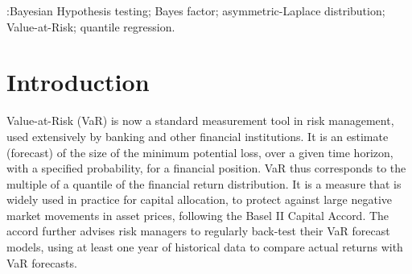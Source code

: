\documentclass[12pt,epsf]{article}
\date{}
\begin{document}
%
%

\noindent

\thispagestyle{empty}
\begin{abstract}
Methods for Bayesian testing and assessment of dynamic quantile forecasts have recently been proposed. Among these,
simple Bayes factor analogues of popular frequentist tests for accuracy of a time series of quantile forecasts have been developed.
To evaluate the relevant marginal likelihoods involved, either inappropriate assumptions of Gaussianity have been made, or
pre-packaged multivariate adaptive quadrature methods have been employed. This paper develops variational Bayes methods to
facilitate a more accurate version of one existing Bayesian test, and to develop a new test that out-performs its competing
Bayesian analogues. The size and power properties of the proposed methods are examined via a simulation study,
illustrating favourable comparisons with existing testing methods. An empirical study employs
the proposed methods, in comparison with standard tests, to assess the adequacy of a range of
forecasting models for Value at Risk (VaR) in several financial market data series.
\end{abstract} :Bayesian Hypothesis
testing; Bayes factor; asymmetric-Laplace distribution; Value-at-Risk; quantile regression.




\section{Introduction}

Value-at-Risk (VaR) is now a standard measurement tool in risk management, used extensively by banking and other financial institutions.
It is an estimate (forecast) of the size of the minimum potential loss, over a given time horizon, with a specified probability,
for a financial position. VaR thus corresponds to the multiple of a quantile of the financial return distribution. It is a measure
that is widely used in practice for capital allocation, to protect against large negative market movements in asset prices,
following the Basel II Capital Accord. The accord further advises risk managers to regularly back-test their VaR forecast models,
using at least one year of historical data to compare actual returns with VaR forecasts.
\end{document}
